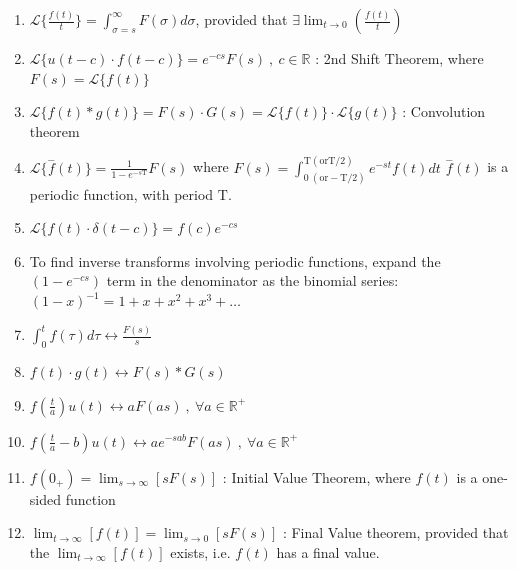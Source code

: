 \documentclass[12pt]{article}
\newcommand{\Tau}{\mathrm{T}} %
\begin{document}
\begin{flushleft}
\begin{enumerate}
	\item $\displaystyle \mathcal{L} \{ \frac{f(t)}{t} \} = \int_{\sigma = s}^{\infty} F(\sigma) d\sigma$, provided that $\exists \lim_{t\to 0} \left( \frac{f(t)}{t} \right) $ 
	\item $\displaystyle \mathcal{L} \{u(t-c) \cdot f(t-c) \} = e^{-cs} F(s)\ , \ c\in \mathbb{R} $  :  2nd Shift Theorem, where $F(s) = \mathcal{L} \{ f(t) \}$
	\item $\displaystyle \mathcal{L} \{ f(t) \ast g(t) \} = F(s) \cdot G(s) = \mathcal{L} \{ f(t) \} \cdot \mathcal{L} \{ g(t) \}$  :  Convolution theorem 
	\item $\displaystyle \mathcal{L} \big\{ \overset{-}{f} (t) \big\} = \frac{1}{1-e^{-s\Tau}} F(s) $ \linebreak 
	where $\displaystyle F(s) = \int_{0\ ( \text{or} -\Tau / 2)}^{\Tau ( \text{or} \Tau / 2)} e^{-st} f(t) dt$ \linebreak 
	$\displaystyle \overset{-}{f} (t)$ is a periodic function, with period $\Tau$. 
	\item $\displaystyle \mathcal{L} \{ f(t) \cdot \delta (t-c) \} = f(c) e^{-cs} $ 
	\item To find inverse transforms involving periodic functions, expand the $\displaystyle (1-e^{-cs})$ term in the denominator as the binomial series: $\displaystyle (1-x)^{-1} = 1 +x + x^2 + x^3 + \ldots$ 
	\item $\displaystyle \int_0^t f(\tau) d\tau \leftrightarrow \frac{F(s)}{s}$ 
	\item $\displaystyle f(t) \cdot g(t) \leftrightarrow F(s) \ast G(s) $ 
	\item $\displaystyle f(\frac{t}{a}) u(t) \leftrightarrow aF(as) \ , \ \forall a\in \mathbb{R}^+ $ 
	\item $\displaystyle f(\frac{t}{a} -b) u(t) \leftrightarrow ae^{-sab} F(as) \ , \ \forall a\in \mathbb{R}^+ $ 
	\item $\displaystyle f(0_+) = \lim_{s\to \infty} \left[ sF(s) \right] $  :  Initial Value Theorem, where $f(t)$ is a one-sided function 
	\item $\displaystyle \lim_{t\to \infty } \left[ f(t) \right] = \lim_{s \to 0} \left[ sF(s) \right] $  :  Final Value theorem, \linebreak 
	provided that the $\displaystyle \lim_{t\to \infty} \left[ f(t) \right] $ exists, i.e. $f(t)$ has a final value. 
	\end{enumerate} 
	

\end{flushleft}
\end{document}
